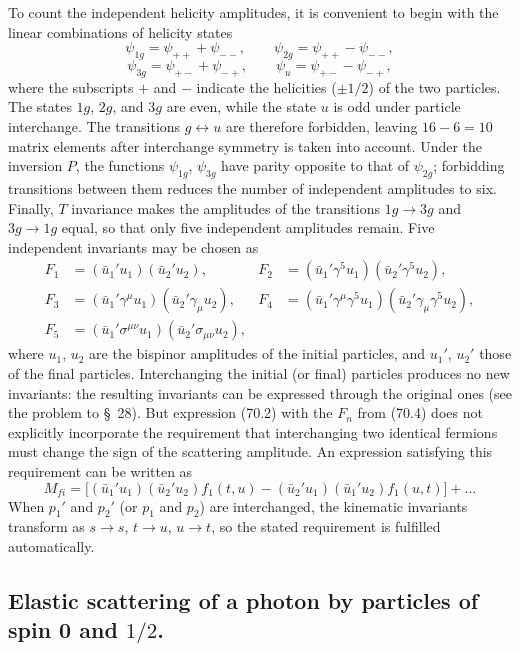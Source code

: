 To count the independent helicity amplitudes, it is convenient to begin with the linear combinations of helicity states
\[
\psi_{1g}=\psi_{++}+\psi_{--},\qquad
\psi_{2g}=\psi_{++}-\psi_{--},
\]
\[
\psi_{3g}=\psi_{+-}+\psi_{-+},\qquad
\psi_u=\psi_{+-}-\psi_{-+},
\]
where the subscripts $+$ and $-$ indicate the helicities ($\pm1/2$) of the two particles. The states $1g$, $2g$, and $3g$ are even, while the state $u$ is odd under particle interchange. The transitions $g\leftrightarrow u$ are therefore forbidden, leaving $16-6=10$ matrix elements after interchange symmetry is taken into account. Under the inversion
$P$, the functions $\psi_{1g}$, $\psi_{3g}$ have parity opposite to that of $\psi_{2g}$; forbidding transitions between them reduces the number of independent amplitudes to six. Finally, $T$ invariance makes the amplitudes of the transitions $1g\to3g$ and $3g\to1g$ equal, so that only five independent amplitudes remain. Five independent invariants may be chosen as
\begin{equation}
\begin{aligned}
F_1&=(\bar u_1'u_1)(\bar u_2'u_2),
&F_2&=(\bar u_1'\gamma^5u_1)(\bar u_2'\gamma^5u_2),\\
F_3&=(\bar u_1'\gamma^\mu u_1)(\bar u_2'\gamma_\mu u_2),
&F_4&=(\bar u_1'\gamma^\mu\gamma^5u_1)(\bar u_2'\gamma_\mu\gamma^5u_2),\\
F_5&=(\bar u_1'\sigma^{\mu\nu}u_1)(\bar u_2'\sigma_{\mu\nu}u_2),
\end{aligned}
\tag{70.4}
\end{equation}
where $u_1$, $u_2$ are the bispinor amplitudes of the initial particles, and $u_1'$, $u_2'$ those of the final particles. Interchanging the initial (or final) particles produces no new invariants: the resulting invariants can be expressed through the original ones (see the problem to \S~28). But expression (70.2) with the $F_n$ from (70.4) does not explicitly incorporate the requirement that interchanging two identical fermions must change the sign of the scattering amplitude. An expression satisfying this requirement can be written as
\begin{equation}
M_{fi}=\bigl[(\bar u_1'u_1)(\bar u_2'u_2)f_1(t,u)
-(\bar u_2'u_1)(\bar u_1'u_2)f_1(u,t)\bigr]+\ldots
\tag{70.5}
\end{equation}
When $p_1'$ and $p_2'$ (or $p_1$ and $p_2$) are interchanged, the kinematic invariants transform as $s\to s$, $t\to u$, $u\to t$, so the stated requirement is fulfilled automatically.

\subsection*{Elastic scattering of a photon by particles of spin 0 and $1/2$.}

